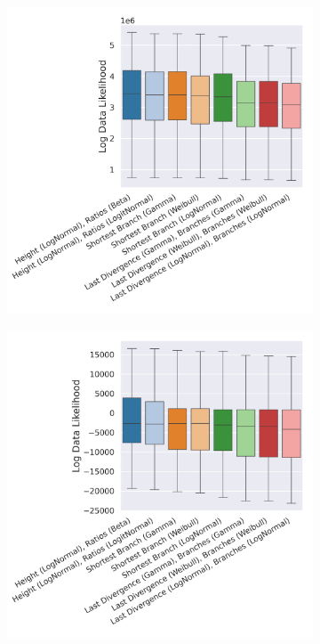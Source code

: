 \documentclass[10pt,letterpaper]{article}
\begin{document}
\begin{figure}
	\begin{subfigure}[b]{0.4\textwidth}
		\centering
		\includegraphics[width=\textwidth]{figures/yule-400-ccd1-likelihood.png}
	\end{subfigure}
	\begin{subfigure}[b]{0.4\textwidth}
		\centering
		\includegraphics[width=\textwidth]{figures/bio-ccd1-likelihood.png}
	\end{subfigure}
	
	\label{fig:data-likelihood}
\end{figure}
\end{document}
